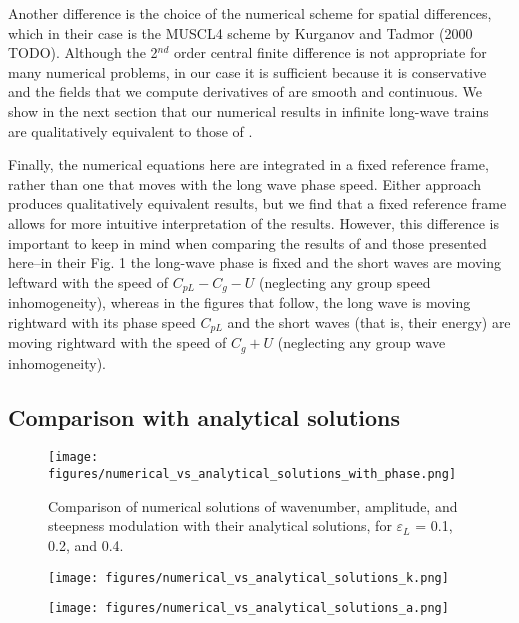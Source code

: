 \documentclass[draft]{agujournal2019}
\begin{document}
Another difference is the choice of the numerical scheme for spatial differences,
which in their case is the MUSCL4 scheme by Kurganov and Tadmor (2000 TODO).
Although the 2$^{nd}$ order central finite difference is not appropriate for many
numerical problems, in our case it is sufficient because it is conservative and
the fields that we compute derivatives of are smooth and continuous.
We show in the next section that our numerical results in infinite long-wave
trains are qualitatively equivalent to those of .

Finally, the numerical equations here are integrated in a fixed reference frame,
rather than one that moves with the long wave phase speed.
Either approach produces qualitatively equivalent results, but we find that
a fixed reference frame allows for more intuitive interpretation of the results.
However, this difference is important to keep in mind when comparing the results
of  and those presented here--in their Fig. 1 the
long-wave phase is fixed and the short waves are moving leftward
with the speed of $C_{pL} - C_g - U$ (neglecting any group speed inhomogeneity),
whereas in the figures that follow, the long wave is moving rightward with its
phase speed $C_{pL}$ and the short waves (that is, their energy) are moving
rightward with the speed of $C_g + U$ (neglecting any group wave inhomogeneity).

\subsection{Comparison with analytical solutions}
\label{subsection:comparison_with_analytical_solutions}

\begin{figure}[h]
\label{fig:numerical_solutions}
\centering
\texttt{[image: figures/numerical\_vs\_analytical\_solutions\_with\_phase.png]}
\caption{
  Comparison of numerical solutions of wavenumber, amplitude, and steepness modulation
  with their analytical solutions, for $\varepsilon_L$ = 0.1, 0.2, and 0.4.
}
\end{figure}

\begin{figure}[h]
\label{fig:numerical_vs_analytical_k}
\centering
\texttt{[image: figures/numerical\_vs\_analytical\_solutions\_k.png]}
\caption{}
\end{figure}

\begin{figure}[h]
\label{fig:numerical_vs_analytical_a}
\centering
\texttt{[image: figures/numerical\_vs\_analytical\_solutions\_a.png]}
\caption{}
\end{figure}
\end{document}
